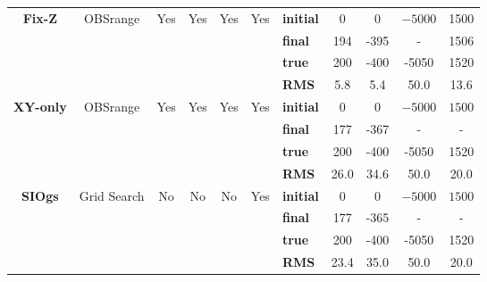 \begin{table}
{\begin{tabular}{c | c c c c c | l c c c c}
\hline
\multirow{4}{*}{\textbf{Fix-Z}} & \multirow{4}{*}{OBSrange} & \multirow{4}{*}{Yes} & \multirow{4}{*}{Yes} & \multirow{4}{*}{Yes} & \multirow{4}{*}{Yes} & \textbf{initial} & 0 & 0 & $\mathit{-5000}$ & 1500 \\ 
\multirow{4}{*}{} & \multirow{4}{*}{} & \multirow{4}{*}{} & \multirow{4}{*}{} & \multirow{4}{*}{} & \multirow{4}{*}{} & \textbf{final}& 194 & -395 & - & 1506 \\ 
\multirow{4}{*}{} & \multirow{4}{*}{} & \multirow{4}{*}{} & \multirow{4}{*}{} & \multirow{4}{*}{} & \multirow{4}{*}{} & \textbf{true}& 200 & -400 & -5050 & 1520 \\ 
\multirow{4}{*}{} & \multirow{4}{*}{} & \multirow{4}{*}{} & \multirow{4}{*}{} & \multirow{4}{*}{} & \multirow{4}{*}{} & \textbf{RMS} & 5.8 & 5.4 & 50.0 & 13.6 \\ 
\hline
\multirow{4}{*}{\textbf{XY-only}} & \multirow{4}{*}{OBSrange} & \multirow{4}{*}{Yes} & \multirow{4}{*}{Yes} & \multirow{4}{*}{Yes} & \multirow{4}{*}{Yes} & \textbf{initial} & 0 & 0 & $\mathit{-5000}$ & $\mathit{1500}$ \\ 
\multirow{4}{*}{} & \multirow{4}{*}{} & \multirow{4}{*}{} & \multirow{4}{*}{} & \multirow{4}{*}{} & \multirow{4}{*}{} & \textbf{final}& 177 & -367 & - & - \\ 
\multirow{4}{*}{} & \multirow{4}{*}{} & \multirow{4}{*}{} & \multirow{4}{*}{} & \multirow{4}{*}{} & \multirow{4}{*}{} & \textbf{true}& 200 & -400 & -5050 & 1520 \\ 
\multirow{4}{*}{} & \multirow{4}{*}{} & \multirow{4}{*}{} & \multirow{4}{*}{} & \multirow{4}{*}{} & \multirow{4}{*}{} & \textbf{RMS} & 26.0 & 34.6 & 50.0 & 20.0 \\ 
\hline
\multirow{4}{*}{\textbf{SIOgs}} & \multirow{4}{*}{Grid Search} & \multirow{4}{*}{No} & \multirow{4}{*}{No} & \multirow{4}{*}{No} & \multirow{4}{*}{Yes} & \textbf{initial} & 0 & 0 & $\mathit{-5000}$ & $\mathit{1500}$ \\ 
\multirow{4}{*}{} & \multirow{4}{*}{} & \multirow{4}{*}{} & \multirow{4}{*}{} & \multirow{4}{*}{} & \multirow{4}{*}{} & \textbf{final}& 177 & -365 & - & - \\ 
\multirow{4}{*}{} & \multirow{4}{*}{} & \multirow{4}{*}{} & \multirow{4}{*}{} & \multirow{4}{*}{} & \multirow{4}{*}{} & \textbf{true}& 200 & -400 & -5050 & 1520 \\ 
\multirow{4}{*}{} & \multirow{4}{*}{} & \multirow{4}{*}{} & \multirow{4}{*}{} & \multirow{4}{*}{} & \multirow{4}{*}{} & \textbf{RMS} & 23.4 & 35.0 & 50.0 & 20.0 \\ 

\end{tabular}}
\end{table}
